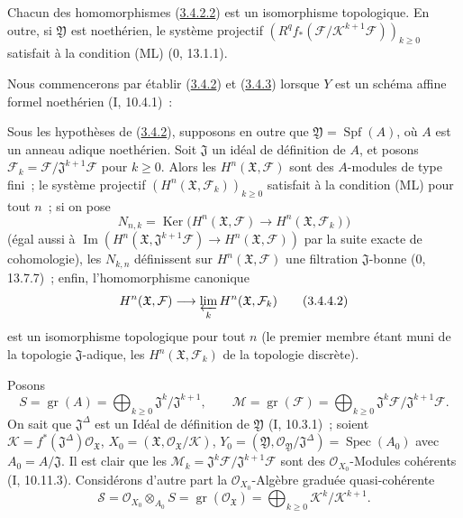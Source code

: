 \begin{corollary}[3.4.3]
\label{III.3.4.3-fr}
Chacun des homomorphismes (\hyperref[III.3.4.2.2-fr]{3.4.2.2}) est un
isomorphisme topologique. En outre, si $\mathfrak Y$ est noethérien, le
système projectif
$(R^qf_*(\mathcal F/\mathcal K^{k+1}\mathcal F))_{k\geq0}$ satisfait à la
condition (ML) (0, 13.1.1).
\end{corollary}

Nous commencerons par établir (\hyperref[III.3.4.2-fr]{3.4.2}) et
(\hyperref[III.3.4.3-fr]{3.4.3}) lorsque $Y$ est un schéma affine
formel noethérien (I, 10.4.1)~:

\begin{corollary}[3.4.4]
\label{III.3.4.4-fr}
Sous les hypothèses de (\hyperref[III.3.4.2-fr]{3.4.2}), supposons en outre
que $\mathfrak Y=\operatorname{Spf}(A)$, où $A$ est un anneau adique
noethérien. Soit $\mathfrak J$ un idéal de définition de $A$, et posons
$\mathcal F_k=\mathcal F/\mathfrak J^{k+1}\mathcal F$ pour $k\geq0$. Alors
les $H^n(\mathfrak X,\mathcal F)$ sont des $A$-modules de type fini~; le
système projectif $(H^n(\mathfrak X,\mathcal F_k))_{k\geq0}$ satisfait à la
condition (ML) pour tout $n$~; si on pose
\[
N_{n,k}=\operatorname{Ker}\bigl(H^n(\mathfrak X,\mathcal F)
\longrightarrow H^n(\mathfrak X,\mathcal F_k)\bigr)
\tag{3.4.4.1}\label{III.3.4.4.1-fr}
\]
(égal aussi à
$\operatorname{Im}(H^n(\mathfrak X,\mathfrak J^{k+1}\mathcal F)
\to H^n(\mathfrak X,\mathcal F))$ par la suite exacte de cohomologie), les
$N_{k,n}$ définissent sur $H^n(\mathfrak X,\mathcal F)$ une filtration
$\mathfrak J$-bonne (0, 13.7.7)~; enfin, l'homomorphisme canonique
\[
H^n(\mathfrak X,\mathcal F)
\longrightarrow\varprojlim_kH^n(\mathfrak X,\mathcal F_k)
\tag{3.4.4.2}\label{III.3.4.4.2-fr}
\]
est un isomorphisme topologique pour tout $n$ (le premier membre étant muni
de la topologie $\mathfrak J$-adique, les $H^n(\mathfrak X,\mathcal F_k)$ de
la topologie discrète).
\end{corollary}

Posons
\[
S=\operatorname{gr}(A)=\bigoplus_{k\geq0}
\mathfrak J^k/\mathfrak J^{k+1},\qquad
\mathcal M=\operatorname{gr}(\mathcal F)=\bigoplus_{k\geq0}
\mathfrak J^k\mathcal F/\mathfrak J^{k+1}\mathcal F.
\tag{3.4.4.3}\label{III.3.4.4.3-fr}
\]
On sait que $\mathfrak J^\Delta$ est un Idéal de définition de $\mathfrak Y$
(I, 10.3.1)~; soient
$\mathcal K=f^*(\mathfrak J^\Delta)\mathcal O_{\mathfrak X}$,
$X_0=(\mathfrak X,\mathcal O_{\mathfrak X}/\mathcal K)$,
$Y_0=(\mathfrak Y,\mathcal O_{\mathfrak Y}/\mathfrak J^\Delta)
=\operatorname{Spec}(A_0)$ avec $A_0=A/\mathfrak J$. Il est clair que les
$\mathcal M_k=\mathfrak J^k\mathcal F/\mathfrak J^{k+1}\mathcal F$ sont des
$\mathcal O_{X_0}$-Modules cohérents (I, 10.11.3). Considérons d'autre part la
$\mathcal O_{X_0}$-Algèbre graduée quasi-cohérente
\[
\mathcal S=\mathcal O_{X_0}\otimes_{A_0}S
=\operatorname{gr}(\mathcal O_{\mathfrak X})
=\bigoplus_{k\geq0}\mathcal K^k/\mathcal K^{k+1}.
\tag{3.4.4.4}\label{III.3.4.4.4-fr}
\]

